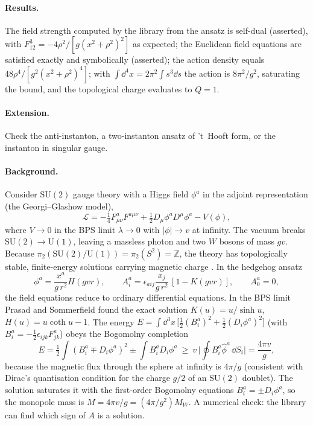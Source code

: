 \paragraph{Results.} The field strength computed by the library from the ansatz is self-dual (asserted), with $F^3_{12}=-4\rho^2/[g(x^2+\rho^2)^2]$ as expected; the Euclidean field equations are satisfied exactly and symbolically (asserted); the action density equals $48\rho^4/[g^2(x^2+\rho^2)^4]$; with $\int\dd^4x=2\pi^2\int s^3\dd s$ the action is $8\pi^2/g^2$, saturating the bound, and the topological charge evaluates to $Q=1$.

\paragraph{Extension.} Check the anti-instanton, a two-instanton ansatz of 't~Hooft form, or the instanton in singular gauge.


\paragraph{Background.} Consider $\mathrm{SU}(2)$ gauge theory with a Higgs field $\phi^a$ in the adjoint representation (the Georgi--Glashow model),
\begin{equation}
\mathcal L=-\tfrac14F^a_{\mu\nu}F^{a\mu\nu}+\tfrac12D_\mu\phi^aD^\mu\phi^a-V(\phi),
\end{equation}
where $V\to0$ in the BPS limit $\lambda\to0$ with $|\phi|\to v$ at infinity. The vacuum breaks $\mathrm{SU}(2)\to\mathrm U(1)$, leaving a massless photon and two $W$ bosons of mass $gv$. Because $\pi_2(\mathrm{SU}(2)/\mathrm U(1))=\pi_2(S^2)=\mathbb Z$, the theory has topologically stable, finite-energy solutions carrying magnetic charge \cite{tHooft1974,Polyakov1974}. In the hedgehog ansatz
\begin{equation}
\phi^a=\frac{x^a}{g\,r^2}H(gvr),\qquad A^a_i=\epsilon_{aij}\frac{x_j}{g\,r^2}\,[1-K(gvr)],\qquad A^a_0=0,
\end{equation}
the field equations reduce to ordinary differential equations. In the BPS limit Prasad and Sommerfield \cite{PrasadSommerfield1975} found the exact solution $K(u)=u/\sinh u$, $H(u)=u\coth u-1$. The energy $E=\int\dd^3x\,\big[\tfrac12(B^a_i)^2+\tfrac12(D_i\phi^a)^2\big]$ (with $B^a_i=-\tfrac12\epsilon_{ijk}F^a_{jk}$) obeys the Bogomolny completion
\begin{equation}
E=\tfrac12\int(B^a_i\mp D_i\phi^a)^2\pm\int B^a_iD_i\phi^a\ \ge\ v\,\Big|\!\oint\!B^a_i\hat\phi^a\,\dd S_i\Big|=\frac{4\pi v}{g},
\end{equation}
because the magnetic flux through the sphere at infinity is $4\pi/g$ (consistent with Dirac's quantisation condition for the charge $g/2$ of an $\mathrm{SU}(2)$ doublet). The solution saturates it with the first-order Bogomolny equations $B^a_i=\pm D_i\phi^a$, so the monopole mass is $M=4\pi v/g=(4\pi/g^2)M_W$. A numerical check: the library can find which sign of $A$ is a solution.

